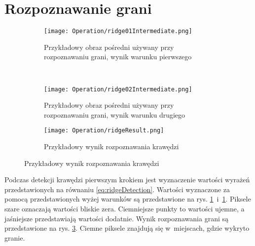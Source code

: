\section{Rozpoznawanie grani}
\label{sec:dzialanieRidge}

\begin{figure}[h]
\begin{center}

\begin{subfigure}[t]{0.4\textwidth}
\texttt{[image: Operation/ridge01Intermediate.png]}
\caption{Przykładowy obraz pośredni używany przy rozpoznawaniu grani, wynik warunku pierwszego}
\label{fig:ridgeIntermediate1}
\end{subfigure}
~
\begin{subfigure}[t]{0.4\textwidth}
\texttt{[image: Operation/ridge02Intermediate.png]}
\caption{Przykładowy obraz pośredni używany przy rozpoznawaniu grani, wynik warunku drugiego}
\label{fig:ridgeIntermediate2}
\end{subfigure}

\begin{subfigure}[t]{0.4\textwidth}
\texttt{[image: Operation/ridgeResult.png]}
\caption{Przykładowy wynik rozpoznawania krawędzi}
\label{fig:ridgeResult}
\end{subfigure}

\end{center}
\label{fig:showEdge}
\end{figure}

Podczas detekcji krawędzi pierwszym krokiem jest wyznaczenie wartości wyrażeń przedstawionych na równaniu \eqref{eq:ridgeDetection}. Wartości wyznaczone za pomocą przedstawionych wyżej warunków są przedstawione na rys. \ref{fig:ridgeIntermediate1}~i~\ref{fig:ridgeIntermediate1}. Piksele szare oznaczają wartości bliskie zera. Ciemniejsze punkty to wartości ujemne, a jaśniejsze przedstawiają wartości dodatnie. Wynik rozpoznawania grani są przedstawione na rys. \ref{fig:ridgeResult}. Ciemne piksele znajdują się w~miejscach, gdzie wykryto granie.
